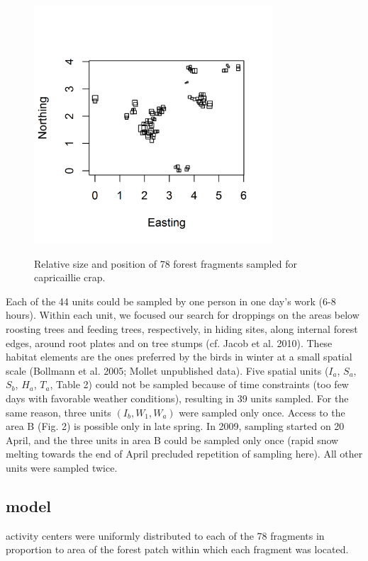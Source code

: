 \begin{figure}
\centering
\includegraphics[width=3.5in,height=3.5in]{Ch15-searchencounter/figs/Cap-fragments.png}
\label{poisson-mn.fig.capfrags}
\caption{Relative size and position of 78 forest fragments sampled for
  capricaillie crap.}
\end{figure}


Each of the 44 units
could be sampled by one person in
one day's work (6-8 hours). Within each unit, we focused our search
for droppings on the areas below roosting trees and feeding trees,
respectively, in hiding sites, along internal forest edges, around
root plates and on tree stumps (cf. Jacob et al. 2010). These habitat
elements are the ones preferred by the birds in winter at a small
spatial scale (Bollmann et al. 2005; Mollet unpublished data).
Five spatial units ($I_a$, $S_a$, $S_b$, $H_a$, $T_a$, Table 2) could
not be sampled because of time constraints (too few days with
favorable weather conditions), resulting in 39 units sampled. For the
same reason, three units $(I_b, W_1, W_a)$ were sampled only
once. Access to the area B (Fig. 2) is possible only in late
spring. In 2009, sampling started on 20 April, and the three units in
area B could be sampled only once (rapid snow melting towards the end
of April precluded repetition of sampling here). All other units were
sampled twice.




\subsection{model}

activity centers were uniformly distributed to each of the 78
fragments in proportion to area of the forest patch within which each
fragment was located.


